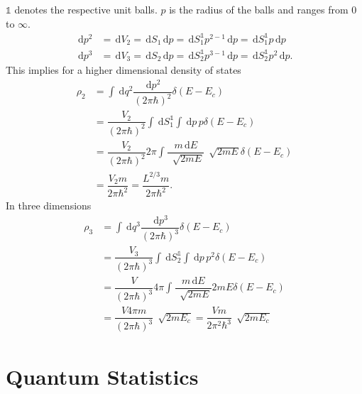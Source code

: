 \documentclass[a4paper,10pt]{article}
\newcommand{\td}{\,\text{d}}
\newcommand{\id}{\mathds{1}}
\numberwithin{equation}{section}
\begin{document}
\begin{multicols}{2}
$\id$ denotes the respective unit balls.
$p$ is the radius of the balls and ranges from $0$ to $\infty$.
\begin{align} 
  \td p^2 &= \td V_2 = \td S_1\td p = \td S_1^\id p^{2-1}\td p = \td S_1^\id p\td p\\
  \td p^3 &= \td V_3 = \td S_2\td p = \td S_2^\id p^{3-1}\td p = \td S_2^\id p^2\td p
.\end{align} 
This implies for a higher dimensional density of states
\begin{align} 
  \rho _2 &= \int_{}^{}\td q^2\dfrac{\td p^2}{(2\pi \hbar )^2}\delta (E-E_c)\\
          &= \dfrac{V_2}{(2\pi \hbar )^2}\int_{}^{}\td S_1^\id\int_{}^{}\td p \,p\delta (E-E_c)\\
          &= \dfrac{V_2}{(2\pi \hbar )^2}2\pi \int_{}^{}\dfrac{m\td E}{\,\sqrt[]{2mE}}\,\sqrt[]{2mE}\delta (E-E_c)\\
          &= \dfrac{V_2m}{2\pi \hbar ^2} = \dfrac{L^{2/3}m}{2\pi \hbar ^2}
.\end{align} 
In three dimensions
\begin{align} 
  \rho _3 &= \int_{}^{}\td q^3\dfrac{\td p^3}{(2\pi \hbar )^3}\delta (E-E_c)\\
          &= \dfrac{V_3}{(2\pi \hbar )^3}\int_{}^{}\td S_2^\id \int_{}^{}\td p\, p^2\delta (E-E_c)\\
          &= \dfrac{V}{(2\pi \hbar )^3}4\pi \int_{}^{}\dfrac{m\td E}{\,\sqrt[]{2mE}}2mE\delta (E-E_c)\\
          &= \dfrac{V4\pi m}{(2\pi \hbar )^3}\,\sqrt[]{2mE_c}=\dfrac{Vm}{2\pi ^2\hbar ^3}\,\sqrt[]{2mE_c}
\end{align} 


\section{Quantum Statistics}

\end{multicols}
\end{document}
